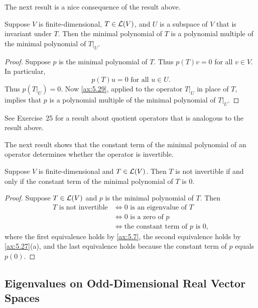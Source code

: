The next result is a nice consequence of the result above.

\begin{result}\label{ax:5.31}
Suppose $V$ is finite-dimensional, $T\in\mathcal{L}(V)$, and $U$ is a subspace of
$V$ that is invariant under $T$. Then the minimal polynomial of $T$ is a
polynomial multiple of the minimal polynomial of $T|_U$.
\end{result}

\begin{proof}
Suppose $p$ is the minimal polynomial of $T$. Thus $p(T)v=0$ for all $v\in V$.
In particular,
\[ p(T)u=0 \text{ for all } u\in U. \]
Thus $p(T|_U)=0$. Now \ref{ax:5.29}, applied to the operator $T|_U$ in place
of $T$, implies that $p$ is a polynomial multiple of the minimal polynomial of
$T|_U$.
\end{proof}

See Exercise~25 for a result about quotient operators that is analogous to the
result above.

The next result shows that the constant term of the minimal polynomial of an
operator determines whether the operator is invertible.

\begin{result}\label{ax:5.32}
Suppose $V$ is finite-dimensional and $T\in\mathcal{L}(V)$. Then $T$ is not
invertible if and only if the constant term of the minimal polynomial of $T$
is $0$.
\end{result}

\begin{proof}
Suppose $T\in\mathcal{L}(V)$ and $p$ is the minimal polynomial of $T$. Then
\begin{align*}
T \text{ is not invertible}
  &\iff 0 \text{ is an eigenvalue of } T\\
  &\iff 0 \text{ is a zero of } p\\
  &\iff \text{the constant term of } p \text{ is } 0,
\end{align*}
where the first equivalence holds by \ref{ax:5.7}, the second equivalence
holds by \ref{ax:5.27}(a), and the last equivalence holds because the constant
term of $p$ equals $p(0)$.
\end{proof}

\subsection{Eigenvalues on Odd-Dimensional Real Vector Spaces}

